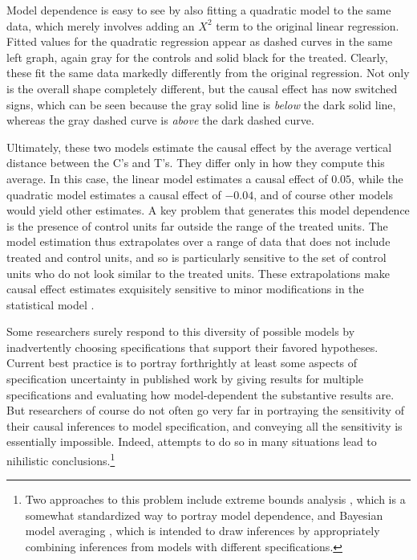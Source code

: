 \documentclass[11pt,titlepage]{article}
\begin{document}
Model dependence is easy to see by also fitting a quadratic model to
the same data, which merely involves adding an $X^2$ term to the
original linear regression.  Fitted values for the quadratic
regression appear as dashed curves in the same left graph, again gray
for the controls and solid black for the treated.  Clearly, these fit
the same data markedly differently from the original regression.  Not
only is the overall shape completely different, but the causal effect
has now switched signs, which can be seen because the gray solid line
is \emph{below} the dark solid line, whereas the gray dashed curve is
\emph{above} the dark dashed curve.

Ultimately, these two models estimate the causal effect by the average
vertical distance between the C's and T's.  They differ only in how
they compute this average.  In this case, the linear model estimates a
causal effect of $0.05$, while the quadratic model estimates a causal
effect of $-0.04$, and of course other models would yield other
estimates.  A key problem that generates this model dependence is the
presence of control units far outside the range of the treated units.
The model estimation thus extrapolates over a range of data that does
not include treated and control units, and so is particularly
sensitive to the set of control units who do not look similar to the
treated units.  These extrapolations make causal effect estimates
exquisitely sensitive to minor modifications in the statistical model
\citep{KinZen06b}.

Some researchers surely respond to this diversity of possible models
by inadvertently choosing specifications that support their favored
hypotheses.  Current best practice is to portray forthrightly at least
some aspects of specification uncertainty in published work by giving
results for multiple specifications and evaluating how model-dependent
the substantive results are.  But researchers of course do not often
go very far in portraying the sensitivity of their causal inferences
to model specification, and conveying all the sensitivity is
essentially impossible.  Indeed, attempts to do so in many situations
lead to nihilistic conclusions.\footnote{Two approaches to this
  problem include extreme bounds analysis \citep{Leamer78}, which is a
  somewhat standardized way to portray model dependence, and Bayesian
  model averaging \citep{HoeMadRaf99,ImaKin04}, which is intended to
  draw inferences by appropriately combining inferences from models
  with different specifications.}
\end{document}
